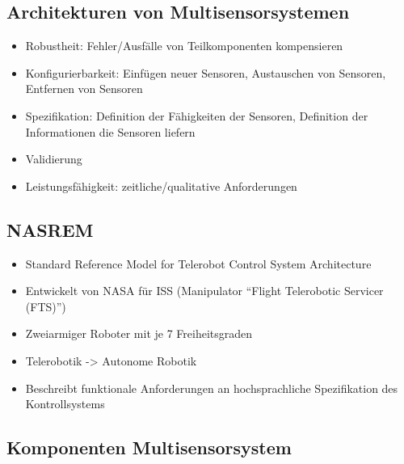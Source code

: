 \documentclass[paper=a4, fontsize=11pt]{scrartcl} %
\numberwithin{equation}{section} %
\numberwithin{figure}{section} %
\numberwithin{table}{section} %
\begin{document}
\subsection{Architekturen von Multisensorsystemen}

\begin{itemize}
\item Robustheit: Fehler/Ausfälle von Teilkomponenten kompensieren
\item Konfigurierbarkeit: Einfügen neuer Sensoren, Austauschen von Sensoren, Entfernen von Sensoren
\item Spezifikation: Definition der Fähigkeiten der Sensoren, Definition der Informationen die Sensoren liefern
\item Validierung
\item Leistungsfähigkeit: zeitliche/qualitative Anforderungen
\end{itemize}

\subsection{NASREM}

\begin{itemize}
\item Standard Reference Model for Telerobot Control System Architecture
\item Entwickelt von NASA für ISS (Manipulator ``Flight Telerobotic Servicer (FTS)'')
\item Zweiarmiger Roboter mit je 7 Freiheitsgraden
\item Telerobotik -> Autonome Robotik
\item Beschreibt funktionale Anforderungen an hochsprachliche Spezifikation des Kontrollsystems
\end{itemize}

\subsection{Komponenten Multisensorsystem}
\end{document}
